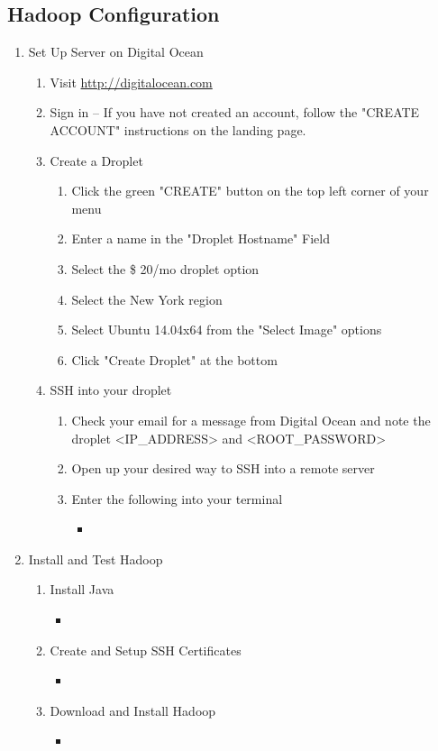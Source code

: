 \documentclass[twoside]{article}
\newcommand{\insertcode}[2]{\begin{itemize}\item[]\end{itemize}} %
\begin{document}
\subsection{Hadoop Configuration}
\begin{enumerate}
	\item Set Up Server on Digital Ocean
	\begin{enumerate}
		\item Visit \url{http://digitalocean.com}
		\item Sign in -- If you have not created an account, follow the "CREATE ACCOUNT" instructions on the landing page.
		\item Create a Droplet
		\begin{enumerate}
			\item Click the green "CREATE"  button on the top left corner of your menu
			\item Enter a name in the "Droplet Hostname" Field
			\item Select the \$ 20/mo droplet option
			\item Select the New York region
			\item Select Ubuntu 14.04x64 from the "Select Image" options
			\item Click "Create Droplet" at the bottom
		\end{enumerate}
		\item SSH into your droplet
			\begin{enumerate}
				\item Check your email for a message from Digital Ocean and note the droplet <IP\_ADDRESS> and <ROOT\_PASSWORD>
				\item Open up your desired way to SSH into a remote server
				\item Enter the following into your terminal
				\insertcode{"scripts/do_server_output"}{Server Output from Digital Ocean}
			\end{enumerate}
	\end{enumerate}
	\item Install and Test Hadoop
	\begin{enumerate}
		\item Install Java
		\insertcode{"scripts/do_install_java"}{Server Output from Installing Java}
		\item Create and Setup SSH Certificates
		\insertcode{"scripts/do_setup_ssh"}{Server Output from Setting Up SSH}
		\item Download and Install Hadoop
		\insertcode{"scripts/do_download_hadoop"}{Server Output from Downloading Hadoop}

\end{enumerate}
\end{enumerate}
\end{document}
